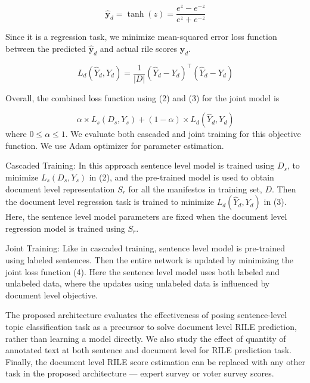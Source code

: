 \documentclass[11pt,a4paper]{article}
\begin{document}
\[ \hat{\bm{y}}_{d} = \tanh(z) = \frac{e^z - e^{-z}}{e^z + e^{-z}} \]

Since it is a regression task, we minimize mean-squared error loss function between the predicted $\hat{\bm{y}}_{d}$ and actual rile scores $\bm{y}_{d}$.

\begin{equation}
L_{d}(\hat{Y}_{d}, Y_{d}) = \frac{1}{|D|}  (\hat{Y}_{d} - Y_{d})^\top (\hat{Y}_{d} - Y_{d})
\end{equation}

Overall, the combined loss function using (2) and (3) for the joint model is 

\begin{equation}
 \alpha \times L_{s}(D_{s},Y_{s}) + (1-\alpha) \times L_{d}(\hat{Y}_{d}, Y_{d})
\end{equation}
where $0 \le \alpha \le 1$.
We evaluate both cascaded and joint training for this objective function. We use Adam optimizer \cite{DBLP:journals/corr/KingmaB14} for parameter estimation. 
\begin{description}
\item{Cascaded Training:} In this approach sentence level model is trained using $D_{s}$, to minimize $L_{s}(D_{s},Y_{s})$ in (2), and the pre-trained model is used to obtain document level representation $S_{r}$ for all the manifestos in training set, $D$. Then the document level regression task is trained to minimize $L_{d}(\hat{Y}_{d}, Y_{d})$ in (3). Here, the sentence level model parameters are fixed when the document level regression model is trained using $S_{r}$.

\item{Joint Training:} Like in cascaded training, sentence level model is pre-trained using labeled sentences. Then the entire network is updated by minimizing the joint loss function (4). Here the sentence level model uses both labeled and unlabeled data, where the updates using unlabeled data is influenced by document level objective.
\end{description}


The proposed architecture evaluates the effectiveness of posing sentence-level topic classification task as a precursor to solve document level RILE prediction, rather than learning a model directly.  We also study the effect of quantity of annotated text at both sentence and document level for RILE prediction task. Finally, the document level RILE score estimation can be replaced with any other task in the proposed architecture --- expert survey or voter survey scores.
\end{document}
